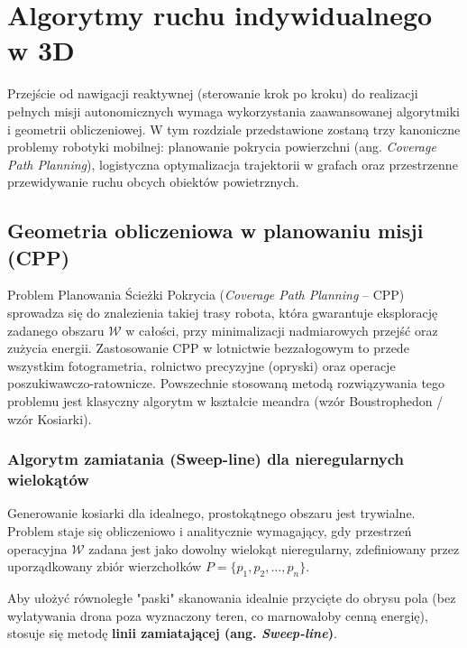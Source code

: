 \chapter{Algorytmy ruchu indywidualnego w 3D}

Przejście od nawigacji reaktywnej (sterowanie krok po kroku) do realizacji pełnych misji autonomicznych wymaga wykorzystania zaawansowanej algorytmiki i geometrii obliczeniowej. W tym rozdziale przedstawione zostaną trzy kanoniczne problemy robotyki mobilnej: planowanie pokrycia powierzchni (ang. \textit{Coverage Path Planning}), logistyczna optymalizacja trajektorii w grafach oraz przestrzenne przewidywanie ruchu obcych obiektów powietrznych.

\section{Geometria obliczeniowa w planowaniu misji (CPP)}

Problem Planowania Ścieżki Pokrycia (\textit{Coverage Path Planning} -- CPP) sprowadza się do znalezienia takiej trasy robota, która gwarantuje eksplorację zadanego obszaru $\mathcal{W}$ w całości, przy minimalizacji nadmiarowych przejść oraz zużycia energii. Zastosowanie CPP w lotnictwie bezzałogowym to przede wszystkim fotogrametria, rolnictwo precyzyjne (opryski) oraz operacje poszukiwawczo-ratownicze. Powszechnie stosowaną metodą rozwiązywania tego problemu jest klasyczny algorytm w kształcie meandra (wzór Boustrophedon / wzór Kosiarki).

\subsection{Algorytm zamiatania (Sweep-line) dla nieregularnych wielokątów}

Generowanie kosiarki dla idealnego, prostokątnego obszaru jest trywialne. Problem staje się obliczeniowo i analitycznie wymagający, gdy przestrzeń operacyjna $\mathcal{W}$ zadana jest jako dowolny wielokąt nieregularny, zdefiniowany przez uporządkowany zbiór wierzchołków $P = \{p_1, p_2, \dots, p_n\}$.

Aby ułożyć równoległe "paski" skanowania idealnie przycięte do obrysu pola (bez wylatywania drona poza wyznaczony teren, co marnowałoby cenną energię), stosuje się metodę \textbf{linii zamiatającej (ang. \textit{Sweep-line})}. 

